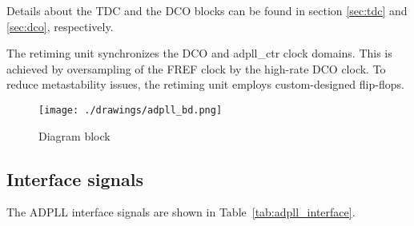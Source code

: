 Details about the TDC and the DCO blocks can be found in section \ref{sec:tdc} and \ref{sec:dco}, respectively.

The retiming unit synchronizes the DCO and adpll\_ctr clock domains.
This is achieved by oversampling of the FREF clock by the high-rate
DCO clock. To reduce metastability issues, the retiming unit employs
custom-designed flip-flops.




\begin{figure}[!h]
  \centering
      {\texttt{[image: ./drawings/adpll\_bd.png]}}
  \caption{Diagram block}
  \label{fig:adpll_bd}
\end{figure}



\subsection{Interface signals}

The ADPLL interface signals are shown in Table~\ref{tab:adpll_interface}. 

